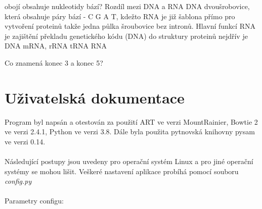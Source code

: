 \documentclass[czech,DP]{thesiskiv}
\numberwithin{equation}{section}
\begin{document}
obojí obsahuje nukleotidy bází? 
Rozdíl mezi DNA a RNA
DNA dvoušrobovice, která obsahuje páry bází - C G A T, kdežto RNA je již šablona přímo pro vytvoření proteinů takže jedna půlka šroubovice bez intronů. 
Hlavní funkcí RNA je zajištění překladu genetického kódu (DNA) do struktury proteinů
nejdřív je DNA  mRNA, rRNA tRNA RNA

Co znamená konec 3 a konec 5? 

% 
%
\nocite{*}

{\raggedright\small

}


\appendix
\chapter{Uživatelská dokumentace}
Program byl napsán a otestován za použití ART ve verzi MountRainier, Bowtie 2 ve verzi 2.4.1, Python ve verzi 3.8. Dále byla použita pytnovská knihovny pysam ve verzi 0.14. 
\\
\\
Následující postupy jsou uvedeny pro operační systém Linux a pro jiné operační systémy se mohou lišit. Veškeré nastavení aplikace probíhá pomocí souboru \textit{config.py}
\\
\\
\noindent
Parametry configu:
\end{document}
